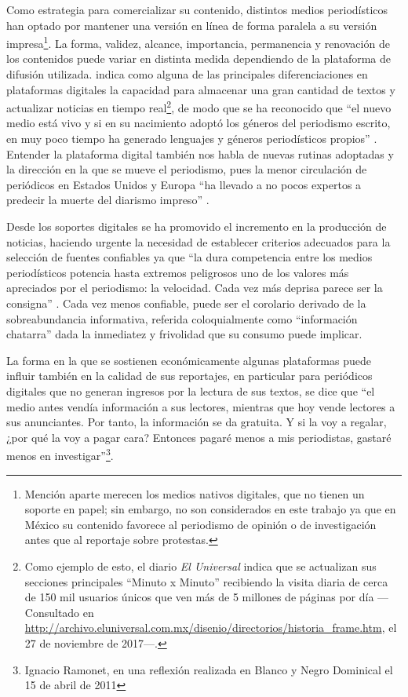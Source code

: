\documentclass[letterpaper, 11pt]{book}
\theoremstyle{definition}
\theoremstyle{remark}
\begin{document}
Como estrategia para comercializar su contenido, distintos medios periodísticos han optado por mantener una versión en línea de forma paralela a su versión impresa\footnote{Mención aparte merecen los medios nativos digitales, que no tienen un soporte en papel; sin embargo, no son considerados en este trabajo ya que en México su contenido favorece al periodismo de opinión o de investigación antes que al reportaje sobre protestas.}. 
La forma, validez, alcance, importancia, permanencia y renovación de los contenidos puede variar en distinta medida dependiendo de la plataforma de difusión utilizada. 
\citet{2006_Albornoz_PeriodismoDigital} indica como alguna de las principales diferenciaciones en plataformas digitales la capacidad para almacenar una gran cantidad de textos y actualizar noticias en tiempo real\footnote{Como ejemplo de esto, el diario \emph{El Universal} indica que se actualizan sus secciones principales ``Minuto x Minuto'' recibiendo la visita diaria de cerca de 150 mil usuarios únicos que ven más de 5 millones de páginas por día ---Consultado en \url{http://archivo.eluniversal.com.mx/disenio/directorios/historia_frame.htm}, el 27 de noviembre de 2017---.}, de modo que se ha reconocido que ``el nuevo medio está vivo y si en su nacimiento adoptó los géneros del periodismo escrito, en muy poco tiempo ha generado lenguajes y géneros periodísticos propios'' \citep[12]{2011_Valcarce_ciberperiodismo}. 
Entender la plataforma digital también nos habla de nuevas rutinas adoptadas y la dirección en la que se mueve el periodismo, pues la menor circulación de periódicos en Estados Unidos y Europa ``ha llevado a no pocos expertos a predecir la muerte del diarismo impreso'' \citep[53]{2008_ASF_Medios}.

Desde los soportes digitales se ha promovido el incremento en la producción de noticias, haciendo urgente la necesidad de establecer criterios adecuados para la selección de fuentes confiables ya que ``la dura competencia entre los medios periodísticos potencia hasta extremos peligrosos uno de los valores más apreciados por el periodismo: la velocidad. Cada vez más deprisa parece ser la consigna'' \citep[20]{2011_Valcarce_ciberperiodismo}. 
Cada vez menos confiable, puede ser el corolario derivado de la sobreabundancia informativa, referida coloquialmente como ``información chatarra'' dada la inmediatez y frivolidad que su consumo puede implicar.

La forma en la que se sostienen económicamente algunas plataformas puede influir también en la calidad de sus reportajes, en particular para periódicos digitales que no generan ingresos por la lectura de sus textos, se dice que ``el medio antes vendía información a sus lectores, mientras que hoy vende lectores a sus anunciantes. Por tanto, la información se da gratuita. Y si la voy a regalar, ¿por qué la voy a pagar cara? Entonces pagaré menos a mis periodistas, gastaré menos en investigar''\footnote{Ignacio Ramonet, en una reflexión realizada en Blanco y Negro Dominical el 15 de abril de 2011}.
\end{document}
